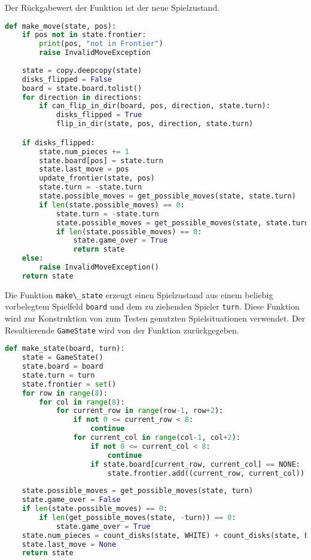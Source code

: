 Der Rückgabewert der Funktion ist der neue Spielzustand.

\begin{lstlisting}[language=Python]
def make_move(state, pos):
    if pos not in state.frontier:
        print(pos, "not in Frontier")
        raise InvalidMoveException
    
    state = copy.deepcopy(state)
    disks_flipped = False
    board = state.board.tolist()
    for direction in directions:
        if can_flip_in_dir(board, pos, direction, state.turn):
            disks_flipped = True
            flip_in_dir(state, pos, direction, state.turn)

    if disks_flipped:
        state.num_pieces += 1
        state.board[pos] = state.turn
        state.last_move = pos
        update_frontier(state, pos)
        state.turn = -state.turn
        state.possible_moves = get_possible_moves(state, state.turn)
        if len(state.possible_moves) == 0:
            state.turn = -state.turn
            state.possible_moves = get_possible_moves(state, state.turn)
            if len(state.possible_moves) == 0:
                state.game_over = True
                return state
    else:
        raise InvalidMoveException()
    return state
\end{lstlisting}

Die Funktion \passthrough{\lstinline!make\_state!} erzeugt einen
Spielzustand aus einem beliebig vorbelegtem Spielfeld
\passthrough{\lstinline!board!} und dem zu ziehenden Spieler
\passthrough{\lstinline!turn!}. Diese Funktion wird zur Konstruktion von
zum Testen genutzten Spielsituationen verwendet. Der Resultierende
\passthrough{\lstinline!GameState!} wird von der Funktion zurückgegeben.

\begin{lstlisting}[language=Python]
def make_state(board, turn):
    state = GameState()
    state.board = board
    state.turn = turn
    state.frontier = set()
    for row in range(8):
        for col in range(8):
            for current_row in range(row-1, row+2):
                if not 0 <= current_row < 8:
                    continue
                for current_col in range(col-1, col+2):
                    if not 0 <= current_col < 8:
                        continue
                    if state.board[current_row, current_col] == NONE:
                        state.frontier.add((current_row, current_col))
            
    state.possible_moves = get_possible_moves(state, turn)
    state.game_over = False
    if len(state.possible_moves) == 0:
        if len(get_possible_moves(state, -turn)) == 0:
            state.game_over = True
    state.num_pieces = count_disks(state, WHITE) + count_disks(state, BLACK)
    state.last_move = None
    return state
\end{lstlisting}
